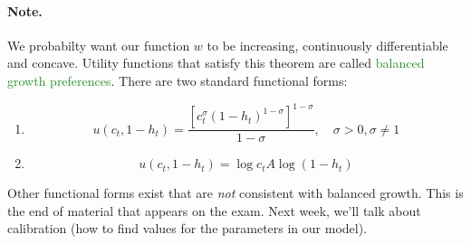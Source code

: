 \documentclass[11pt]{article}
\newcommand{\gr}{\textcolor{ForestGreen}}
\begin{document}
\paragraph{Note.} We probabilty want our function \(w\) to be increasing, continuously differentiable and concave. Utility functions that satisfy this theorem are called \gr{balanced growth preferences}. There are two standard functional forms:
\begin{enumerate}
\item
\[
u(c_t, 1 - h_t) = \frac{[c_t^\sigma (1 - h_t)^{1 - \sigma}]^{1 - \sigma}}{1 - \sigma}, \quad \sigma > 0, \sigma \ne 1
\]
\item
\[
u(c_t, 1 - h_t) = \log c_t A \log(1 - h_t)
\]
\end{enumerate}
Other functional forms exist that are \emph{not} consistent with balanced growth. This is the end of material that appears on the exam. Next week, we'll talk about calibration (how to find values for the parameters in our model).
\end{document}
